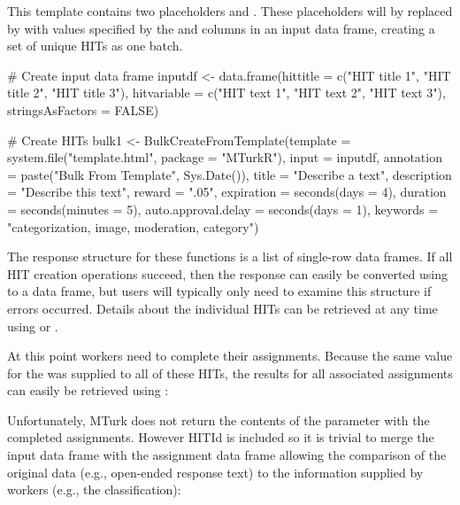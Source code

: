 \noindent This template contains two placeholders
 and .  These
placeholders will by replaced by 
with values specified by the  and 
columns in an input data frame, creating a set of unique HITs as one
batch.

\begin{example}
# Create input data frame
inputdf <- data.frame(hittitle = c("HIT title 1", "HIT title 2", "HIT title 3"),
                      hitvariable = c("HIT text 1", "HIT text 2", "HIT text 3"), 
                      stringsAsFactors = FALSE)

# Create HITs
bulk1 <- 
  BulkCreateFromTemplate(template = system.file("template.html", package = "MTurkR"),
                         input = inputdf,
                         annotation = paste("Bulk From Template", Sys.Date()),
                         title = "Describe a text",
                         description = "Describe this text",
                         reward = ".05",
                         expiration = seconds(days = 4),
                         duration = seconds(minutes = 5),
                         auto.approval.delay = seconds(days = 1),
                         keywords = "categorization, image, moderation, category")
\end{example}

\noindent The response structure for these functions is a list of
single-row data frames. If all HIT creation operations succeed,
then the response can easily be converted using  to a data frame, but users will typically only need
to examine this structure if errors occurred. Details about the
individual HITs can be retrieved at any time using  or
.

At this point workers need to complete their assignments. Because the same value for the  was supplied to all of these HITs, the results for all associated assignments can easily be retrieved using :


\noindent Unfortunately, MTurk does not return the contents of the  parameter with the completed assignments. However HITId is included so it is trivial to merge the input data frame with the assignment data frame allowing the comparison of the original data (e.g., open-ended response text) to the information supplied by workers (e.g., the classification):

